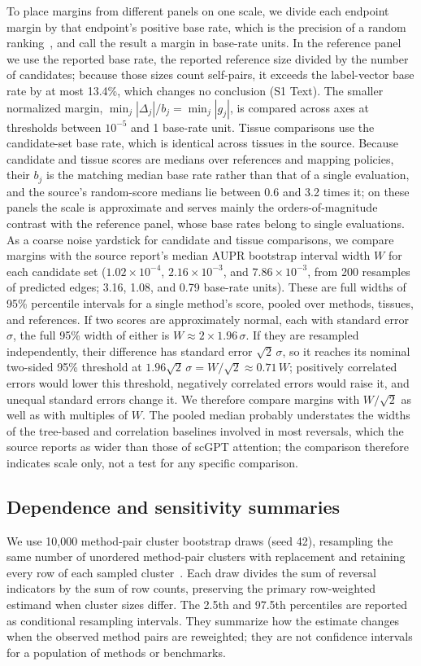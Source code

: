 \documentclass[10pt,letterpaper]{article}
\begin{document}
To place margins from different panels on one scale, we divide each endpoint margin by that endpoint's positive base rate, which is the precision of a random ranking~\cite{flach2015prg}, and call the result a margin in base-rate units. In the reference panel we use the reported base rate, the reported reference size divided by the number of candidates; because those sizes count self-pairs, it exceeds the label-vector base rate by at most 13.4\%, which changes no conclusion (S1 Text). The smaller normalized margin, $\min_j|\Delta_j|/b_j=\min_j|g_j|$, is compared across axes at thresholds between $10^{-5}$ and 1 base-rate unit. Tissue comparisons use the candidate-set base rate, which is identical across tissues in the source. Because candidate and tissue scores are medians over references and mapping policies, their $b_j$ is the matching median base rate rather than that of a single evaluation, and the source's random-score medians lie between 0.6 and 3.2 times it; on these panels the scale is approximate and serves mainly the orders-of-magnitude contrast with the reference panel, whose base rates belong to single evaluations. As a coarse noise yardstick for candidate and tissue comparisons, we compare margins with the source report's median AUPR bootstrap interval width $W$ for each candidate set ($1.02\times10^{-4}$, $2.16\times10^{-3}$, and $7.86\times10^{-3}$, from 200 resamples of predicted edges; 3.16, 1.08, and 0.79 base-rate units). These are full widths of 95\% percentile intervals for a single method's score, pooled over methods, tissues, and references. If two scores are approximately normal, each with standard error $\sigma$, the full 95\% width of either is $W\approx2\times1.96\,\sigma$. If they are resampled independently, their difference has standard error $\sqrt2\,\sigma$, so it reaches its nominal two-sided 95\% threshold at $1.96\sqrt2\,\sigma=W/\sqrt2\approx0.71\,W$; positively correlated errors would lower this threshold, negatively correlated errors would raise it, and unequal standard errors change it. We therefore compare margins with $W/\sqrt2$ as well as with multiples of $W$. The pooled median probably understates the widths of the tree-based and correlation baselines involved in most reversals, which the source reports as wider than those of scGPT attention; the comparison therefore indicates scale only, not a test for any specific comparison.

\subsection*{Dependence and sensitivity summaries}
We use 10{,}000 method-pair cluster bootstrap draws (seed 42), resampling the same number of unordered method-pair clusters with replacement and retaining every row of each sampled cluster~\cite{cameron2008bootstrap,efron1994bootstrap}. Each draw divides the sum of reversal indicators by the sum of row counts, preserving the primary row-weighted estimand when cluster sizes differ. The 2.5th and 97.5th percentiles are reported as conditional resampling intervals. They summarize how the estimate changes when the observed method pairs are reweighted; they are not confidence intervals for a population of methods or benchmarks.
\end{document}
